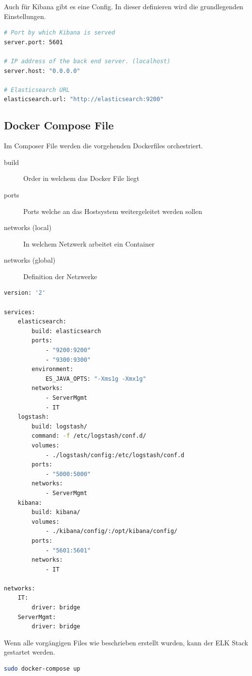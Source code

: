 Auch für Kibana gibt es eine Config. In dieser definieren wird die grundlegenden Einstellungen.	
\begin{lstlisting}[caption=kibana.yml, language=bash]
# Port by which Kibana is served
server.port: 5601

# IP address of the back end server. (localhost)
server.host: "0.0.0.0"

# Elasticsearch URL
elasticsearch.url: "http://elasticsearch:9200"
\end{lstlisting}


\subsection{Docker Compose File}
Im Composer File werden die vorgehenden Dockerfiles orchestriert.
\begin{description}
	\item[build] Order in welchem das Docker File liegt
	\item[ports] Ports welche an das Hostsystem weitergeleitet werden sollen
	\item[networks (local)] In welchem Netzwerk arbeitet ein Container
	\item[networks (global)] Definition der Netzwerke
\end{description}
\begin{lstlisting}[caption=docker-compose.yml Compose File, language=bash]
version: '2'

services:
	elasticsearch:
		build: elasticsearch
		ports:
			- "9200:9200"
			- "9300:9300"
		environment:
			ES_JAVA_OPTS: "-Xms1g -Xmx1g"
		networks:
			- ServerMgmt
			- IT
	logstash:
		build: logstash/
		command: -f /etc/logstash/conf.d/
		volumes:
			- ./logstash/config:/etc/logstash/conf.d
		ports:
			- "5000:5000"
		networks:
			- ServerMgmt
	kibana:
		build: kibana/
		volumes:
			- ./kibana/config/:/opt/kibana/config/
		ports:
			- "5601:5601"
		networks:
			- IT

networks:
	IT:
		driver: bridge
	ServerMgmt:
		driver: bridge
\end{lstlisting}

Wenn alle vorgängigen Files wie beschrieben erstellt wurden, kann der ELK Stack gestartet werden.
\begin{lstlisting}[language=bash]
sudo docker-compose up
\end{lstlisting}


